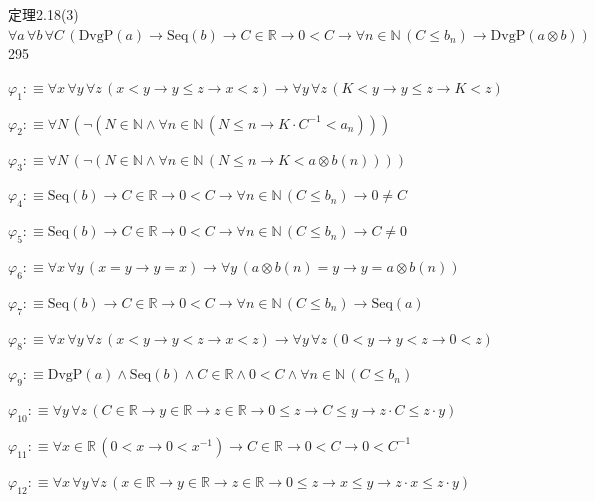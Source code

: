 \begin{fullproof}{定理2.18(3)}{$\forall a\,\forall b\,\forall C\,(\mathrm{DvgP}(a) \to \mathrm{Seq}(b) \to C \in \mathbb{R} \to 0 < C \to \forall n \in \mathbb{N}\,(C \leq b_{n}) \to \mathrm{DvgP}(a \otimes b))$}{295}
\begin{ptree}
\end{ptree}
\begin{abbrevlist}
\item $\varphi_{1} :\equiv \forall x\,\forall y\,\forall z\,(x < y \to y \leq z \to x < z) \to \forall y\,\forall z\,(K < y \to y \leq z \to K < z)$
\item $\varphi_{2} :\equiv \forall N\,(\neg (N \in \mathbb{N} \land \forall n \in \mathbb{N}\,(N \leq n \to K \cdot C^{-1} < a_{n})))$
\item $\varphi_{3} :\equiv \forall N\,(\neg (N \in \mathbb{N} \land \forall n \in \mathbb{N}\,(N \leq n \to K < a \otimes b(n))))$
\item $\varphi_{4} :\equiv \mathrm{Seq}(b) \to C \in \mathbb{R} \to 0 < C \to \forall n \in \mathbb{N}\,(C \leq b_{n}) \to 0 \neq C$
\item $\varphi_{5} :\equiv \mathrm{Seq}(b) \to C \in \mathbb{R} \to 0 < C \to \forall n \in \mathbb{N}\,(C \leq b_{n}) \to C \neq 0$
\item $\varphi_{6} :\equiv \forall x\,\forall y\,(x = y \to y = x) \to \forall y\,(a \otimes b(n) = y \to y = a \otimes b(n))$
\item $\varphi_{7} :\equiv \mathrm{Seq}(b) \to C \in \mathbb{R} \to 0 < C \to \forall n \in \mathbb{N}\,(C \leq b_{n}) \to \mathrm{Seq}(a)$
\item $\varphi_{8} :\equiv \forall x\,\forall y\,\forall z\,(x < y \to y < z \to x < z) \to \forall y\,\forall z\,(0 < y \to y < z \to 0 < z)$
\item $\varphi_{9} :\equiv \mathrm{DvgP}(a) \land \mathrm{Seq}(b) \land C \in \mathbb{R} \land 0 < C \land \forall n \in \mathbb{N}\,(C \leq b_{n})$
\item $\varphi_{10} :\equiv \forall y\,\forall z\,(C \in \mathbb{R} \to y \in \mathbb{R} \to z \in \mathbb{R} \to 0 \leq z \to C \leq y \to z \cdot C \leq z \cdot y)$
\item $\varphi_{11} :\equiv \forall x \in \mathbb{R}\,(0 < x \to 0 < x^{-1}) \to C \in \mathbb{R} \to 0 < C \to 0 < C^{-1}$
\item $\varphi_{12} :\equiv \forall x\,\forall y\,\forall z\,(x \in \mathbb{R} \to y \in \mathbb{R} \to z \in \mathbb{R} \to 0 \leq z \to x \leq y \to z \cdot x \leq z \cdot y)$

\end{abbrevlist}
\end{fullproof}
